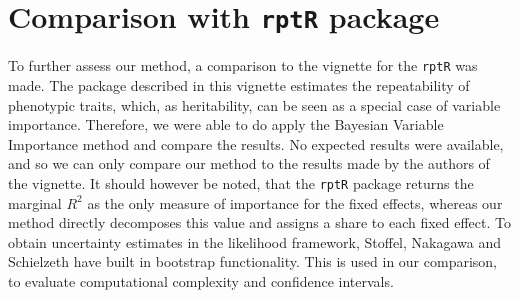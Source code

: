 

\section{Comparison with \texttt{rptR} package}
To further assess our method, a comparison to the vignette for the \texttt{rptR} was made. The package described in this vignette estimates the repeatability of phenotypic traits, which, as heritability, can be seen as a special case of variable importance. Therefore, we were able to do apply the Bayesian Variable Importance method and compare the results. No expected results were available, and so we can only compare our method to the results made by the authors of the vignette. It should however be noted, that the \texttt{rptR} package returns the marginal $R^2$ as the only measure of importance for the fixed effects, whereas our method directly decomposes this value and assigns a share to each fixed effect. To obtain uncertainty estimates in the likelihood framework, Stoffel, Nakagawa and Schielzeth have built in bootstrap functionality. This is used in our comparison, to evaluate computational complexity and confidence intervals.

